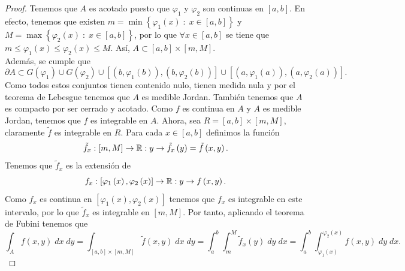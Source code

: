 \begin{proof}
	Tenemos que $\displaystyle A $ es acotado puesto que $\displaystyle \varphi_{1} $ y $\displaystyle \varphi_{2} $ son continuas en $\displaystyle \left[a,b\right]  $. En efecto, tenemos que existen $\displaystyle m=\min \left\{ \varphi_{1}\left(x\right) \; : \; x \in \left[a,b\right] \right\}  $ y $\displaystyle M = \max \left\{ \varphi_{2}\left(x\right) \; : \; x \in \left[a,b\right] \right\}  $, por lo que $\displaystyle \forall x \in \left[a,b\right]  $ se tiene que $\displaystyle m \leq \varphi_{1}\left(x\right)\leq \varphi_{2}\left(x\right)\leq M $. Así, $\displaystyle A \subset \left[a,b\right] \times \left[m,M\right]  $. \\
	Además, se cumple que
	\[\partial A \subset G\left(\varphi_{1}\right)\cup G\left(\varphi_{2}\right)\cup\left[\left(b, \varphi_{1}\left(b\right)\right), \left(b, \varphi_{2}\left(b\right)\right)\right] \cup \left[\left(a, \varphi_{1}\left(a\right)\right), \left(a, \varphi_{2}\left(a\right)\right)\right]  .\]
Como todos estos conjuntos tienen contenido nulo, tienen medida nula y por el teorema de Lebesgue tenemos que $\displaystyle A $ es medible Jordan. También tenemos que $\displaystyle A $ es compacto por ser cerrado y acotado. Como $\displaystyle f $ es continua en $\displaystyle A $ y $\displaystyle A $ es medible Jordan, tenemos que $\displaystyle f $ es integrable en $\displaystyle A $. 
Ahora, sea $\displaystyle R = \left[a,b\right] \times \left[m,M\right]  $, claramente $\displaystyle \tilde{f} $ es integrable en $\displaystyle R $. Para cada $\displaystyle x \in \left[a,b\right]  $ definimos la función
\[\tilde{f}_{x} : \left[m,M\right] \to \mathbb{R} : y \to \tilde{f}_{x}\left(y\right)=\tilde{f}\left(x,y\right) .\]
Tenemos que $\displaystyle \tilde{f}_{x} $ es la extensión de 
\[f_{x}:\left[\varphi_{1}\left(x\right), \varphi_{2}\left(x\right)\right] \to \mathbb{R} : y \to f\left(x,y\right) .\]
Como $\displaystyle f_{x} $ es continua en $\displaystyle \left[\varphi_{1}\left(x\right), \varphi_{2}\left(x\right)\right]  $ tenemos que $\displaystyle f_{x} $ es integrable en este intervalo, por lo que $\displaystyle \tilde{f}_{x} $ es integrable en $\displaystyle \left[m,M\right]  $. 
Por tanto, aplicando el teorema de Fubini tenemos que 
\[\int _{A}f\left(x,y\right) \; dx \; dy = \int _{\left[a,b\right] \times\left[m,M\right] }\tilde{f}\left(x,y\right) \; dx \; dy= \int^{b}_{a} \int^{M}_{m} \tilde{f}_{x}\left(y\right) \; dy \; dx = \int^{b}_{a} \int^{\varphi_{2}\left(x\right)}_{\varphi_{1}\left(x\right)} f\left(x,y\right) \; dy \; dx .\]

\end{proof}
